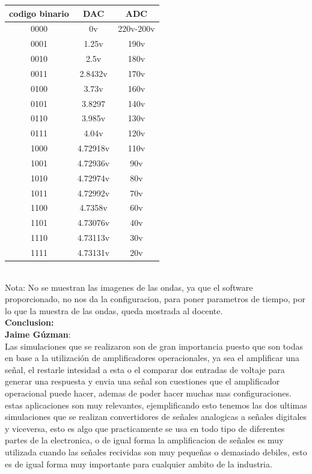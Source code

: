 \documentclass[12pt,a4paper]{article}
\begin{document}
\begin{tabular}{|c|c|c|}
\hline
	codigo binario  & DAC & ADC\\
\hline
	0000 & 0v & 220v-200v\\
\hline
	0001 & 1.25v & 190v\\
\hline
	0010 & 2.5v & 180v\\
\hline
	0011 & 2.8432v & 170v\\
\hline
	0100 & 3.73v & 160v\\
\hline
	0101 & 3.8297 & 140v\\
\hline
	0110 & 3.985v & 130v\\
\hline
	0111 & 4.04v & 120v\\
\hline
	1000 & 4.72918v & 110v\\
\hline
	1001 & 4.72936v & 90v\\
\hline
	1010 & 4.72974v & 80v\\
\hline
	1011 & 4.72992v & 70v\\
\hline
	1100 & 4.7358v & 60v\\
\hline
	1101 & 4.73076v & 40v\\
\hline
	1110 & 4.73113v & 30v\\
\hline
    1111 & 4.73131v & 20v\\
\hline
\end{tabular}\\


Nota: No se muestran las imagenes de las ondas, ya que el software proporcionado, no nos da la configuracion, para poner parametros de tiempo, por lo que la muestra de las ondas, queda mostrada al docente.\\

\textbf{\Large Conclusion:}\\

\textbf{Jaime Gúzman}:\\
Las simulaciones que se realizaron son de gran importancia puesto que son todas en base a la utilización de amplificadores operacionales, ya sea el amplificar una señal, el restarle intesidad  a esta o el comparar dos entradas de voltaje para generar una respuesta y envia una señal son cuestiones que el amplificador operacional puede hacer, ademas de poder hacer muchas mas configuraciones.\\ estas aplicaciones son muy relevantes, ejemplificando esto tenemos las dos ultimas simulaciones que se realizan convertidores de señales analogicas a señales digitales y viceversa, esto es algo que practicamente se usa  en todo tipo de diferentes partes de la electronica, o de igual forma la amplificacion de señales es muy utilizada cuando las señales recividas son muy pequeñas o demasiado debiles, esto es de igual forma muy importante para cualquier ambito de la industria.\\
\end{document}
